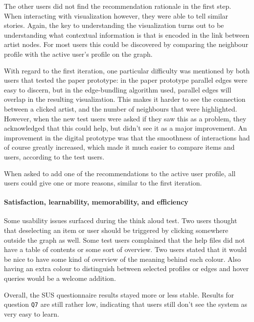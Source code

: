 The other users did not find the recommendation rationale in the first step. When interacting with visualization however, they were able to tell similar stories. Again, the key to understanding the visualization turns out to be understanding what contextual information is that is encoded in the link between artist nodes. For most users this could be discovered by comparing the neighbour profile with the active user's profile on the graph.

With regard to the first iteration, one particular difficulty was mentioned by both users that tested the paper prototype: in the paper prototype parallel edges were easy to discern, but in the edge-bundling algorithm used, parallel edges will overlap in the resulting visualization. This makes it harder to see the connection between a clicked artist, and the number of neighbours that were highlighted. However, when the new test users were asked if they saw this as a problem, they acknowledged that this could help, but didn't see it as a major improvement. An improvement in the digital prototype was that the smoothness of interactions had of course greatly increased, which made it much easier to compare items and users, according to the test users.


When asked to add one of the recommendations to the active user profile, all users could give one or more reasons, similar to the first iteration.


\paragraph{Satisfaction, learnability, memorability, and efficiency}

Some usability issues surfaced during the think aloud test. Two users thought that deselecting an item or user should be triggered by clicking somewhere outside the graph as well. Some test users complained that the help files did not have a table of contents or some sort of overview. Two users stated that it would be nice to have some kind of overview of the meaning behind each colour. Also having an extra colour to distinguish between selected profiles or edges and hover queries would be a welcome addition.

Overall, the SUS questionnaire results stayed more or less stable. Results for question \texttt{Q7} are still rather low, indicating that users still don't see the system as very easy to learn.

